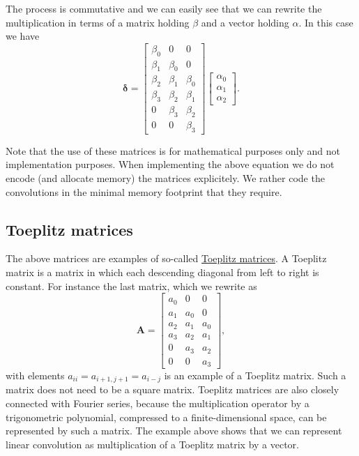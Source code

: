 \documentclass[%
oneside,                 %
final,                   %
10pt]{article}
\begin{document}
The process is commutative and we can easily see that we can rewrite the multiplication in terms of  a matrix holding $\beta$ and a vector holding $\alpha$.
In this case we have
\[
\bm{\delta}=\begin{bmatrix}\beta_0 & 0 & 0  \\
                            \beta_1 & \beta_0 & 0  \\
			    \beta_2 & \beta_1 & \beta_0  \\
			    \beta_3 & \beta_2 & \beta_1 \\
			    0 & \beta_3 & \beta_2 \\
			    0 & 0 & \beta_3
			    \end{bmatrix}\begin{bmatrix} \alpha_0 \\ \alpha_1 \\ \alpha_2\end{bmatrix}.
\]

Note that the use of these matrices is for mathematical purposes only
and not implementation purposes.  When implementing the above equation
we do not encode (and allocate memory) the matrices explicitely.  We
rather code the convolutions in the minimal memory footprint that they
require.

\subsection{Toeplitz matrices}

The above matrices are examples of so-called \href{{https://link.springer.com/book/10.1007/978-93-86279-04-0}}{Toeplitz
matrices}. A
Toeplitz matrix is a matrix in which each descending diagonal from
left to right is constant. For instance the last matrix, which we
rewrite as
\[
\bm{A}=\begin{bmatrix}a_0 & 0 & 0  \\
                            a_1 & a_0 & 0  \\
			    a_2 & a_1 & a_0  \\
			    a_3 & a_2 & a_1 \\
			    0 & a_3 & a_2 \\
			    0 & 0 & a_3
			    \end{bmatrix},
\]
with elements $a_{ii}=a_{i+1,j+1}=a_{i-j}$ is an example of a Toeplitz
matrix. Such a matrix does not need to be a square matrix.  Toeplitz
matrices are also closely connected with Fourier series, because the multiplication operator by a trigonometric
polynomial, compressed to a finite-dimensional space, can be
represented by such a matrix. The example above shows that we can
represent linear convolution as multiplication of a Toeplitz matrix by
a vector.
\end{document}
